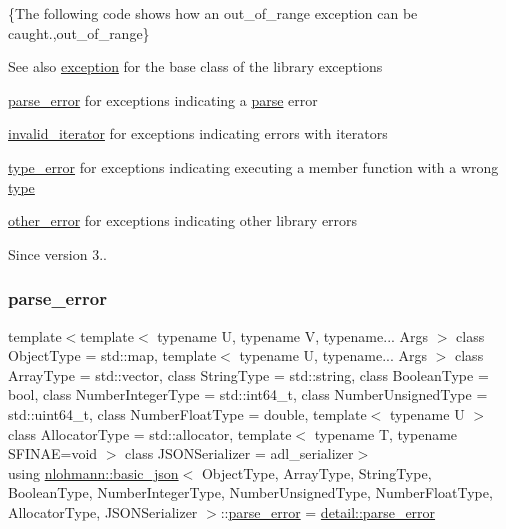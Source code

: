 \{The following code shows how an {\ttfamily out\+\_\+of\+\_\+range} exception can be caught.,out\+\_\+of\+\_\+range\}

\begin{DoxySeeAlso}{See also}
\mbox{\hyperlink{classnlohmann_1_1basic__json_a9a0aced019cb1d65bb49703406c84970}{exception}} for the base class of the library exceptions 

\mbox{\hyperlink{classnlohmann_1_1basic__json_af1efc2468e6022be6e35fc2944cabe4d}{parse\+\_\+error}} for exceptions indicating a \mbox{\hyperlink{classnlohmann_1_1basic__json_aa9676414f2e36383c4b181fe856aa3c0}{parse}} error 

\mbox{\hyperlink{classnlohmann_1_1basic__json_ac13d32f7cbd02d616e71d8dc30dadcbf}{invalid\+\_\+iterator}} for exceptions indicating errors with iterators 

\mbox{\hyperlink{classnlohmann_1_1basic__json_a4010e8e268fefd86da773c10318f2902}{type\+\_\+error}} for exceptions indicating executing a member function with a wrong \mbox{\hyperlink{classnlohmann_1_1basic__json_a2b2d781d7f2a4ee41bc0016e931cadf7}{type}} 

\mbox{\hyperlink{classnlohmann_1_1basic__json_a3333a5a8714912adda33a35b369f7b3d}{other\+\_\+error}} for exceptions indicating other library errors
\end{DoxySeeAlso}
\begin{DoxySince}{Since}
version 3.. 
\end{DoxySince}
\mbox{\label{classnlohmann_1_1basic__json_af1efc2468e6022be6e35fc2944cabe4d}} 
\subsubsection{\texorpdfstring{parse\+\_\+error}{parse\_error}}
{\footnotesize\ttfamily template$<$template$<$ typename U, typename V, typename... Args $>$ class Object\+Type = std\+::map, template$<$ typename U, typename... Args $>$ class Array\+Type = std\+::vector, class String\+Type  = std\+::string, class Boolean\+Type  = bool, class Number\+Integer\+Type  = std\+::int64\+\_\+t, class Number\+Unsigned\+Type  = std\+::uint64\+\_\+t, class Number\+Float\+Type  = double, template$<$ typename U $>$ class Allocator\+Type = std\+::allocator, template$<$ typename T, typename S\+F\+I\+N\+A\+E=void $>$ class J\+S\+O\+N\+Serializer = adl\+\_\+serializer$>$ \\
using \mbox{\hyperlink{classnlohmann_1_1basic__json}{nlohmann\+::basic\+\_\+json}}$<$ Object\+Type, Array\+Type, String\+Type, Boolean\+Type, Number\+Integer\+Type, Number\+Unsigned\+Type, Number\+Float\+Type, Allocator\+Type, J\+S\+O\+N\+Serializer $>$\+::\mbox{\hyperlink{classnlohmann_1_1basic__json_af1efc2468e6022be6e35fc2944cabe4d}{parse\+\_\+error}} =  \mbox{\hyperlink{classnlohmann_1_1detail_1_1parse__error}{detail\+::parse\+\_\+error}}}



